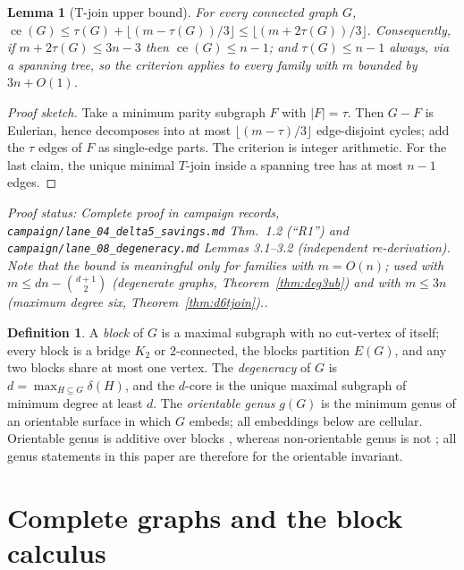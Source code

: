 \documentclass[a4paper,11pt]{amsart}
\newtheorem{lemma}[theorem]{Lemma}
\theoremstyle{definition}
\newtheorem{definition}[theorem]{Definition}
\theoremstyle{remark}
\newcommand{\ce}{\operatorname{ce}}
\newcommand{\proofsrc}[1]{\par\smallskip\noindent\begin{sloppypar}\small\emph{Proof status: #1.}\end{sloppypar}\par\smallskip}
\begin{document}
\begin{lemma}[T-join upper bound]\label{lem:tjoin}
For every connected graph $G$,
$\ce(G)\le \tau(G)+\lfloor (m-\tau(G))/3\rfloor\le\lfloor (m+2\tau(G))/3\rfloor$.
Consequently, if $m+2\tau(G)\le 3n-3$ then $\ce(G)\le n-1$; and $\tau(G)\le n-1$ always, via a spanning
tree, so the criterion applies to every family with $m$ bounded by $3n+O(1)$.
\end{lemma}
\begin{proof}[Proof sketch]
Take a minimum parity subgraph $F$ with $|F|=\tau$. Then $G-F$ is Eulerian, hence decomposes into at most
$\lfloor(m-\tau)/3\rfloor$ edge-disjoint cycles; add the $\tau$ edges of $F$ as single-edge parts. The
criterion is integer arithmetic. For the last claim, the unique minimal $T$-join inside a spanning tree has
at most $n-1$ edges.
\end{proof}
\proofsrc{Complete proof in campaign records, \texttt{campaign/lane\_04\_delta5\_savings.md} Thm.~1.2
(``R1'') and \texttt{campaign/lane\_08\_degeneracy.md} Lemmas 3.1--3.2 (independent re-derivation). Note
that the bound is meaningful only for families with $m=O(n)$; used with $m\le dn-\binom{d+1}{2}$
(degenerate graphs, Theorem~\ref{thm:deg3ub}) and with $m\le3n$ (maximum degree six,
Theorem~\ref{thm:d6tjoin}).}

\begin{definition}\label{def:blocks}
A \emph{block} of $G$ is a maximal subgraph with no cut-vertex of itself; every block is a bridge $K_2$ or
$2$-connected, the blocks partition $E(G)$, and any two blocks share at most one vertex. The
\emph{degeneracy} of $G$ is $d=\max_{H\subseteq G}\delta(H)$, and the $d$-core is the unique maximal
subgraph of minimum degree at least $d$. The \emph{orientable genus} $g(G)$ is the minimum genus of an
orientable surface in which $G$ embeds; all embeddings below are cellular. Orientable genus is additive
over blocks \cite{BHKY62}, whereas non-orientable genus is not \cite{SB77}; all genus statements in this
paper are therefore for the orientable invariant.
\end{definition}

\section{Complete graphs and the block calculus}\label{sec:blocks}
\end{document}
